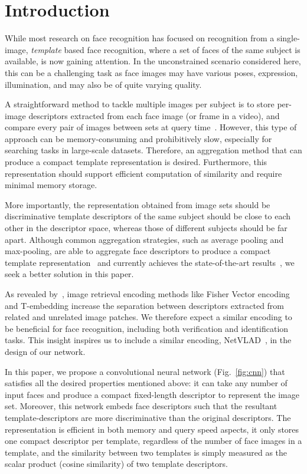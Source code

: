 \documentclass[runningheads]{llncs}
\begin{document}
%
\section{Introduction}
\label{sec:intro}
%
%
%
%
%
While most research on face recognition 
has  focused on recognition from a single-image, 
 {\em template} based  face recognition, where a set of faces of the same subject is available,
is now gaining attention.
In the  unconstrained scenario considered here, this  can be a challenging task as
face images may have 
various poses,  expression, illumination, and may also be of quite varying quality.

A straightforward method to tackle multiple images per 
subject is to store per-image descriptors extracted 
from each face image (or frame in a video), and 
compare every  pair of images between sets at query 
time~\cite{Taigman14,Schroff15}. 
However, this type of approach can be 
memory-consuming and prohibitively 
slow, especially for searching tasks in large-scale datasets.
Therefore, an aggregation method that can 
produce a compact template representation is desired. 
Furthermore, this representation should 
support efficient computation of similarity 
and require minimal memory storage. 

More importantly, the representation 
obtained from image sets should be 
discriminative 
\ie template descriptors of the same subject 
should be close to each other in the descriptor space, 
whereas those of different subjects should be far apart.
Although common aggregation strategies, such as 
average pooling and max-pooling, are able to
aggregate face descriptors to
produce a compact template 
representation~\cite{Parkhi15,Chen15,Cao18} 
and currently achieves the state-of-the-art results~\cite{Cao18},
we seek a better solution in this paper.

As revealed by~\cite{Jegou14}, image retrieval encoding 
methods like Fisher Vector encoding 
and T-embedding increase the separation between 
descriptors extracted from related 
and unrelated image patches. 
We therefore expect a similar encoding to be beneficial 
for  face recognition, including both verification and 
identification tasks. This insight inspires us 
to include a similar encoding, NetVLAD~\cite{Arandjelovic16},  in the design of our 
network.

In this paper, we propose a convolutional neural network (Fig.~\ref{fig:cnn})
that satisfies all the desired properties mentioned above: 
it can take any number of input faces and 
produce a compact fixed-length descriptor to represent 
the image set. Moreover, this network
embeds face descriptors such that the resultant template-descriptors 
are  more discriminative than the original descriptors.
The 
representation is efficient in both 
memory and query speed aspects, \ie  it only stores 
one compact descriptor per template, regardless of the number 
of face images in a template, and the similarity 
between two templates is simply measured as the 
scalar product (\ie cosine similarity) 
of two template descriptors. 
\end{document}
